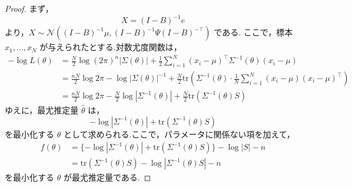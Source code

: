 \documentclass[uplatex, dvipdfmx]{jsarticle}
\begin{document}
\begin{proof}
  まず，
  \begin{equation}
      X = (I - B)^{-1} e
  \end{equation}
  より，$X \sim \mathcal{N}((I - B)^{-1} \mu, (I - B)^{-1} \Psi (I - B)^{-\top})$ である.
  ここで，標本 $x_1, \dots, x_N$ が与えられたとする.対数尤度関数は，
  \begin{align}
      -\log L(\theta) &= \frac{N}{2} \log (2\pi)^n |\Sigma(\theta)| + \frac{1}{2} \sum_{i=1}^N (x_i - \mu)^\top \Sigma^{-1}(\theta) (x_i - \mu) \\
      &= \frac{nN}{2} \log 2\pi - \log |\Sigma(\theta)|^{-1} + \frac{N}{2} \text{tr} \left( \Sigma^{-1}(\theta) \cdot \frac{1}{N} \sum_{i=1}^N (x_i - \mu)(x_i - \mu)^\top \right) \\
      &= \frac{nN}{2} \log 2\pi - \frac{N}{2} \log |\Sigma^{-1}(\theta)| + \frac{N}{2} \text{tr}(\Sigma^{-1}(\theta) S)
  \end{align}
  ゆえに，最尤推定量 $\hat{\theta}$ は，
  \begin{equation}
      -\log |\Sigma^{-1}(\theta)| + \text{tr}(\Sigma^{-1}(\theta) S)
  \end{equation}
  を最小化する $\theta$ として求められる.ここで，パラメータに関係ない項を加えて，
  \begin{align}
      f(\theta) &= \{ -\log |\Sigma^{-1}(\theta)| + \text{tr}(\Sigma^{-1}(\theta) S) \} - \log |S| - n \\
      &= \text{tr}(\Sigma^{-1}(\theta) S) - \log |\Sigma^{-1}(\theta) S| - n
  \end{align}
  を最小化する $\theta$ が最尤推定量である.
\end{proof}
\end{document}

